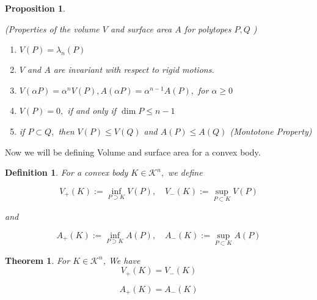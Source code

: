 \documentclass[oneside]{book}
\newtheorem{theorem}{Theorem}[section]
\newtheorem{mydef}{Definition}
\newtheorem{prop}{Proposition}
\begin{document}
\begin{prop} \label{prop:1}


(Properties of the volume $V$ and surface area $A$ for polytopes $P, Q$ )
 \begin{enumerate}
 \item  $V(P)=\lambda_{n}(P)$
 \item  $V$ and $A$ are invariant with respect to rigid motions.
 \item $V(\alpha P)=\alpha^{n} V(P), A(\alpha P)=\alpha^{n-1} A(P),$ for $\alpha \geq 0$
 \item $V(P)=0,$ if and only if $\operatorname{dim} P \leq n-1$
 \item  if $P \subset Q,$ then $V(P) \leq V(Q)$ and $A(P) \leq A(Q)$    (Montotone Property)   \label{prop:5}
 \end{enumerate}
  \end{prop}
 
Now we will be defining Volume and surface area for a convex body.\\


 \begin{mydef}
  For a convex body $K \in \mathcal{K}^{n},$ we define

$$ V_{+}(K):=\inf _{P \supset K} V(P), \quad V_{-}(K):=\sup _{P \subset K} V(P)$$ 

and

$$ A_{+}(K):=\inf _{P \supset K} A(P), \quad A_{-}(K):=\sup _{P \subset K} A(P) $$ 


 \end{mydef}

\begin{theorem} 
For $K \in \mathcal{K}^{n}$, We have 
\begin{equation}
 V_{+}(K)=V_{-}(K)
\end{equation}

   \begin{equation}
   A_{+}(K)=A_{-}(K)
   \end{equation}

\end{theorem}      
\end{document}
